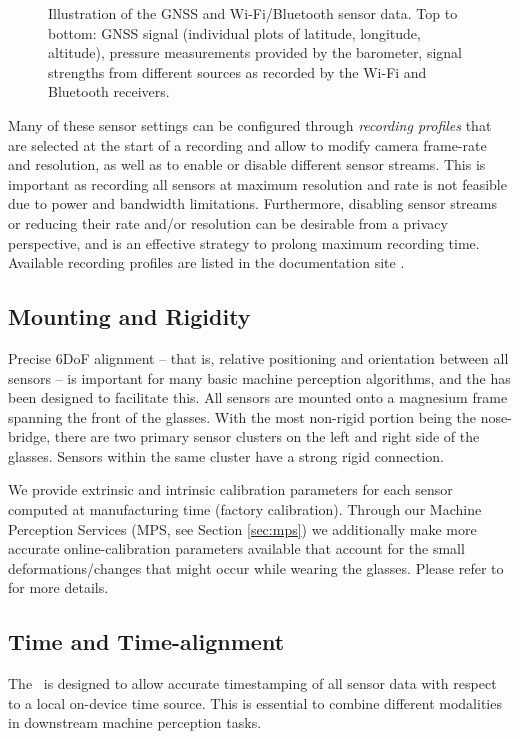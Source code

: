 \begin{figure}[t]
    \caption{Illustration of the GNSS and Wi-Fi/Bluetooth sensor data. Top to bottom:  GNSS signal (individual plots of latitude, longitude, altitude), pressure measurements provided by the barometer,
    signal strengths from different sources as recorded by the Wi-Fi and Bluetooth receivers. 
    }
    \label{fig:aria-multi-modal-gps-wps}
\end{figure}

Many of these sensor settings can be configured through \textit{recording profiles} that are selected at the start of a recording and allow to modify camera frame-rate and resolution, as well as to enable or disable different sensor streams. This is important as recording all sensors at maximum resolution and rate is not feasible due to power and bandwidth limitations. Furthermore, disabling sensor streams or reducing their rate and/or resolution can be desirable from a privacy perspective, and is an effective strategy to prolong maximum recording time. Available recording profiles are listed in the  \ProjectAria{} documentation site \cite{ariadocs}.


\subsection{Mounting and Rigidity}
Precise 6DoF alignment -- that is, relative positioning and orientation between all sensors -- is important for many basic machine perception algorithms, and the \AriaDevice{} has been designed to facilitate this. All sensors are mounted onto a magnesium frame spanning the front of the glasses. With the most non-rigid portion being the nose-bridge, there are two primary sensor clusters on the left and right side of the glasses. Sensors within the same cluster have a strong rigid connection.

We provide extrinsic and intrinsic calibration parameters for each sensor computed at manufacturing time (factory calibration). Through our Machine Perception Services (MPS, see Section \ref{sec:mps}) we additionally make more accurate online-calibration parameters available that account for the small deformations/changes that might occur while wearing the glasses. Please refer to \cite{ariadocs} for more details.

\subsection{Time and Time-alignment}

The \AriaDevice\ is designed to allow accurate timestamping 
of all sensor data with respect to a local on-device time source. This is essential to combine different modalities in downstream machine perception tasks.

